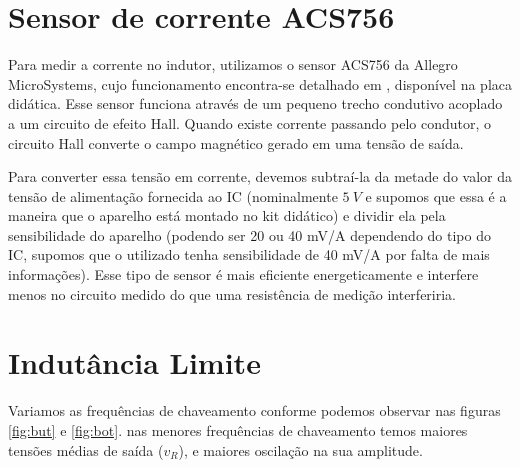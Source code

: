 \documentclass{article}
\begin{document}
\section{Sensor de corrente ACS756}
Para medir a corrente no indutor, utilizamos o sensor ACS756 da Allegro MicroSystems, cujo funcionamento encontra-se detalhado em \cite{bb:allegro}, disponível na placa didática. Esse sensor funciona através de um pequeno trecho condutivo acoplado a um circuito de efeito Hall. Quando existe corrente passando pelo condutor, o circuito Hall converte o campo magnético gerado em uma tensão de saída. 

Para converter essa tensão em corrente, devemos subtraí-la da metade do valor da tensão de alimentação fornecida ao IC (nominalmente $5\ V$ e supomos que essa é a maneira que o aparelho está montado no kit didático) e dividir ela pela sensibilidade do aparelho (podendo ser 20 ou 40 mV/A dependendo do tipo do IC, supomos que o utilizado tenha sensibilidade de 40 mV/A por falta de mais informações). Esse tipo de sensor é mais eficiente energeticamente e interfere menos no circuito medido do que uma resistência de medição interferiria.


\section{Indutância Limite}

Variamos as frequências de chaveamento conforme podemos observar nas figuras \ref{fig:but} e \ref{fig:bot}. nas menores frequências de chaveamento temos maiores tensões médias de saída ($v_R$), e maiores oscilação na sua amplitude.
\end{document}
